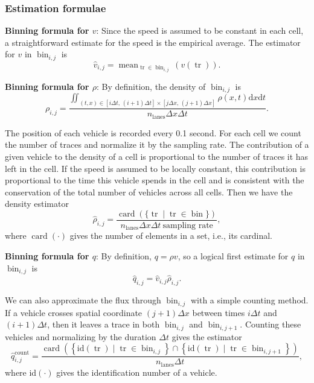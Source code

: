 \documentclass[letterpaper, 10 pt, conference]{ieeeconf}  %
\DeclareMathOperator{\card}{card}
\DeclareMathOperator{\trc}{tr}
\DeclareMathOperator{\mean}{mean}
\DeclareMathOperator{\bin}{bin}
\DeclareMathOperator{\lns}{lanes}
\DeclareMathOperator{\cnt}{count}
\begin{document}
\subsubsection{Estimation formulae}
\textbf{Binning formula for $v$}: Since the speed is assumed to be constant in each cell, a straightforward estimate for the speed is the empirical average. The estimator for $v$ in $\bin_{i,j}$ is
{\footnotesize
\begin{equation}
\widehat{v}_{i,j}=\mean_{\trc \in \bin_{i,j}}(v(\trc)).
\end{equation}
}

\textbf{Binning formula for $\rho$}: By definition, the density of $\bin_{i,j}$ is  
{\footnotesize
\begin{equation}
\rho_{i,j}=
\frac{
	\iint_{\left(t,x\right)\in [i\Delta t, \,(i+1)\Delta t] \times [j\Delta x,\,(j+1)\Delta x]}\rho(x,t) \text{d}x \text{d}t
}{
	n_{\lns}\Delta x\Delta t
}.
\end{equation}
}

The position of each vehicle is recorded every 0.1 second. For each cell we count the number of traces and normalize it by the sampling rate. The contribution of a given vehicle to the density of a cell is proportional to the number of traces it has left in the cell. If the speed is assumed to be locally constant, this contribution is proportional to the time this vehicle spends in the cell and is consistent with the conservation of the total number of vehicles across all cells. Then we have the density estimator
{\footnotesize
\begin{equation}
\widehat{\rho}_{i,j}=
\frac{
\card ( \{ \trc \mid \trc \in \bin \} )
}{
n_{\lns} \Delta x \Delta t \: \text{sampling rate}
},
\end{equation}
}
where $\card (\cdot)$ gives the number of elements in a set, i.e., its cardinal. 

\textbf{Binning formula for $q$}: By definition, $q=\rho v$, so a logical first estimate for $q$ in $\bin_{i,j}$ is 
{\footnotesize
\begin{equation}
\widehat{q}_{i,j}=\widehat{v}_{i,j}\widehat{\rho}_{i,j}.
\end{equation}
}

We can also approximate the flux through $\bin_{i,j}$ with a simple counting method. If a vehicle crosses spatial coordinate $\left(j+1\right)\Delta x$ between times $i\Delta t$ and $\left(i+1\right)\Delta t$, then it leaves a trace in both $\bin_{i,j}$ and $\bin_{i,j+1}$. Counting these vehicles and normalizing by the duration $\Delta t$ gives the estimator
{\footnotesize
\begin{equation}
\widehat{q}_{i,j}^{\cnt}
=
\frac{
	\card\left(\left\{ \text{id} \left(\trc\right)\mid \trc \in \bin_{i,j}\right\} \cap\left\{ \text{id}\left( \trc \right)\mid \trc\in \bin_{i,j+1}\right\} \right)
}{
	n_{\lns}\Delta t
},
\end{equation}
}
where id$(\cdot)$ gives the identification number of a vehicle.
\end{document}
